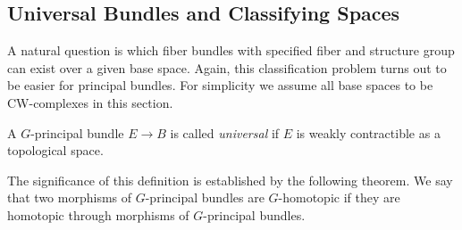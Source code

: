 
\subsection{Universal Bundles and Classifying Spaces}
A natural question is which fiber bundles with specified fiber and structure group can exist over a given base space. Again, this classification problem turns out to be easier for principal bundles.
For simplicity we assume all base spaces to be CW-complexes in this section.

\begin{definition}
    A $G$-principal bundle $E \to B$ is called \textit{universal} if $E$ is weakly contractible as a topological space.
\end{definition}

The significance of this definition is established by the following theorem. We say that two morphisms of $G$-principal bundles are $G$-homotopic if they are homotopic through morphisms of $G$-principal bundles.

